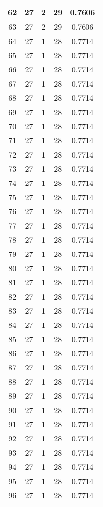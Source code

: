 \documentclass[letterpaper, 12pt]{article}
\begin{document}
\begin{longtable}{|c|c|c|c|c|}
\hline
62 & 27 & 2 & 29 & 0.7606 \\
\hline
63 & 27 & 2 & 29 & 0.7606 \\
\hline
64 & 27 & 1 & 28 & 0.7714 \\
\hline
65 & 27 & 1 & 28 & 0.7714 \\
\hline
66 & 27 & 1 & 28 & 0.7714 \\
\hline
67 & 27 & 1 & 28 & 0.7714 \\
\hline
68 & 27 & 1 & 28 & 0.7714 \\
\hline
69 & 27 & 1 & 28 & 0.7714 \\
\hline
70 & 27 & 1 & 28 & 0.7714 \\
\hline
71 & 27 & 1 & 28 & 0.7714 \\
\hline
72 & 27 & 1 & 28 & 0.7714 \\
\hline
73 & 27 & 1 & 28 & 0.7714 \\
\hline
74 & 27 & 1 & 28 & 0.7714 \\
\hline
75 & 27 & 1 & 28 & 0.7714 \\
\hline
76 & 27 & 1 & 28 & 0.7714 \\
\hline
77 & 27 & 1 & 28 & 0.7714 \\
\hline
78 & 27 & 1 & 28 & 0.7714 \\
\hline
79 & 27 & 1 & 28 & 0.7714 \\
\hline
80 & 27 & 1 & 28 & 0.7714 \\
\hline
81 & 27 & 1 & 28 & 0.7714 \\
\hline
82 & 27 & 1 & 28 & 0.7714 \\
\hline
83 & 27 & 1 & 28 & 0.7714 \\
\hline
84 & 27 & 1 & 28 & 0.7714 \\
\hline
85 & 27 & 1 & 28 & 0.7714 \\
\hline
86 & 27 & 1 & 28 & 0.7714 \\
\hline
87 & 27 & 1 & 28 & 0.7714 \\
\hline
88 & 27 & 1 & 28 & 0.7714 \\
\hline
89 & 27 & 1 & 28 & 0.7714 \\
\hline
90 & 27 & 1 & 28 & 0.7714 \\
\hline
91 & 27 & 1 & 28 & 0.7714 \\
\hline
92 & 27 & 1 & 28 & 0.7714 \\
\hline
93 & 27 & 1 & 28 & 0.7714 \\
\hline
94 & 27 & 1 & 28 & 0.7714 \\
\hline
95 & 27 & 1 & 28 & 0.7714 \\
\hline
96 & 27 & 1 & 28 & 0.7714 \\

\end{longtable}
\end{document}

